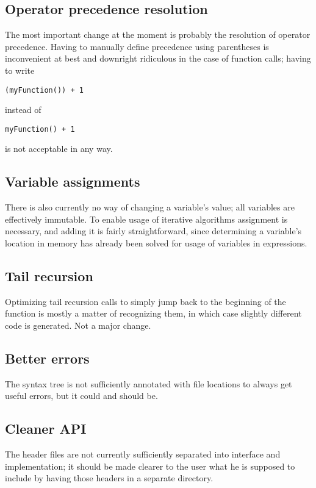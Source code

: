     	\subsection{Operator precedence resolution}
    	
    	The most important change at the moment is probably the resolution of operator precedence. Having to manually define precedence using parentheses is inconvenient at best and downright ridiculous in the case of function calls; having to write
    	\lstperseus
		\begin{lstlisting}
(myFunction()) + 1
		\end{lstlisting}
		instead of
		\begin{lstlisting}
myFunction() + 1
		\end{lstlisting}
		is not acceptable in any way.
		
		\subsection{Variable assignments}
		
		There is also currently no way of changing a variable's value; all variables are effectively immutable. To enable usage of iterative algorithms assignment is necessary, and adding it is fairly straightforward, since determining a variable's location in memory has already been solved for usage of variables in expressions.
		
		\subsection{Tail recursion}
		
		Optimizing tail recursion calls to simply jump back to the beginning of the function is mostly a matter of recognizing them, in which case slightly different code is generated. Not a major change.
		
		\subsection{Better errors}
		
		The syntax tree is not sufficiently annotated with file locations to always get useful errors, but it could and should be.
		
		\subsection{Cleaner API}
		
		The header files are not currently sufficiently separated into interface and implementation; it should be made clearer to the user what he is supposed to include by having those headers in a separate directory.
	
